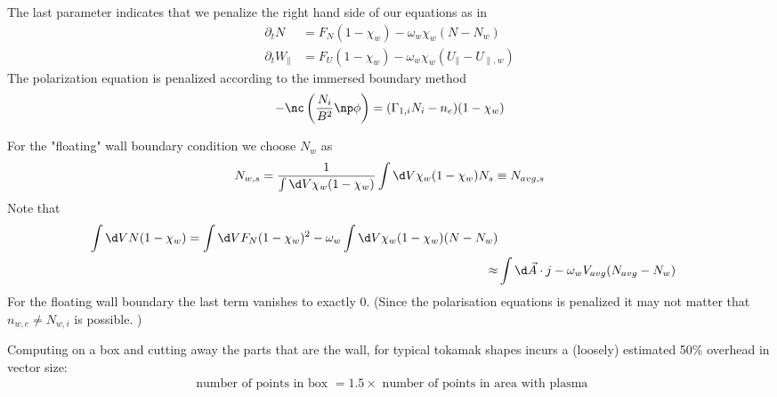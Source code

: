 \noindent
The last parameter indicates that we penalize the right hand side of our equations
as in
\begin{subequations} \label{eq:wall_equations}
\begin{align}
    \partial_t N &= F_N ( 1-\chi_w) -\omega_w\chi_w (N-N_w)\\
\partial_t W_\parallel &= F_U ( 1 - \chi_w) -\omega_w\chi_w (U_\parallel-U_{\parallel,w})
\end{align}
\end{subequations}
The polarization equation is penalized according to the immersed boundary method
\begin{align}
    -\nc\left( \frac{N_i}{B^2}\np \phi \right) = (\Gamma_{1,i} N_i - n_e)(1-\chi_w)
\end{align}

For the "floating" wall boundary condition we choose $N_w$ as
\begin{align}
    N_{w,s} = \frac{1}{\int \d V \chi_w(1-\chi_w)}\int \d V \chi_w ( 1-\chi_w) N_s \equiv N_{avg,s}
\end{align}
Note that
\begin{align}
\int \d V N ( 1- \chi_w) = \int \d V F_N (1-\chi_w)^2 - \omega_w \int \d V \chi_w (1-\chi_w) ( N - N_w)
\nonumber\\
\approx& \int \d \vec A\cdot j - \omega_w V_{avg} (N_{avg} - N_w)
\end{align}
For the floating wall boundary the last term vanishes to exactly $0$. (Since the polarisation equations is
penalized it may not matter that $n_{w,e}\neq N_{w,i}$ is possible. )


\begin{tcolorbox}[title=Note]
    Computing on a box and cutting away the parts that are the wall,
    for typical tokamak shapes incurs a (loosely) estimated 50\% overhead in vector size:
    \begin{align*}
        \text{ number of points in box } = 1.5 \times \text{ number of points in area with plasma}
    \end{align*}
\end{tcolorbox}

